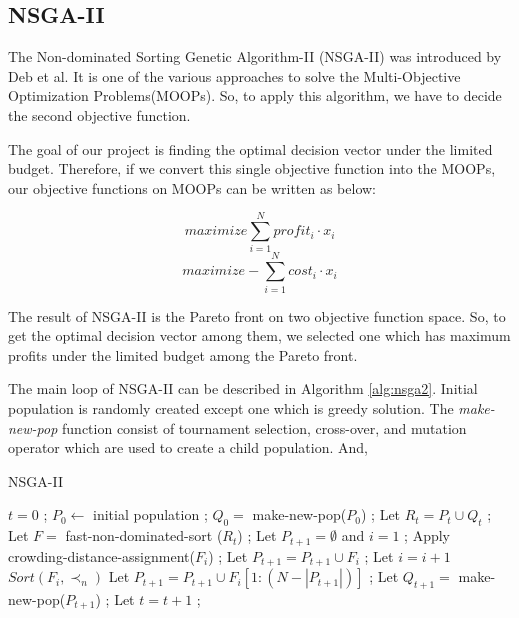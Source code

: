 \subsection{NSGA-II}
The Non-dominated Sorting Genetic Algorithm-II (NSGA-II) was introduced by Deb et al.\cite{NSGA2} It is one of the various approaches to solve the Multi-Objective Optimization Problems(MOOPs). So, to apply this algorithm, we have to decide the second objective function. 

The goal of our project is finding the optimal decision vector under the limited budget. Therefore, if we convert this single objective function into the MOOPs, our objective functions on MOOPs can be written as below:

\[
maximize \sum_{i = 1}^{N} profit_i \cdot x_i
\]
\[
maximize -\sum_{i = 1}^{N} cost_i \cdot x_i
\]

The result of NSGA-II is the Pareto front on two objective function space. So, to get the optimal decision vector among them, we selected one which has maximum profits under the limited budget among the Pareto front.

The main loop of NSGA-II can be described in Algorithm \ref{alg:nsga2}. Initial population is randomly created except one which is greedy solution. The \textit{make-new-pop} function consist of tournament selection, cross-over, and mutation operator which are used to create a child population. And, 

\begin{algorithm}
\caption{NSGA-II}\label{alg:nsga2}
\begin{algorithmic}
    \State $t = 0$ ;
    \State $P_0 \gets$ initial population ;
    \State $Q_0 =$ make-new-pop($P_0$) ;
        \State Let $R_t = P_t \cup Q_t$ ;
        \State Let $F = $ fast-non-dominated-sort ($R_t$) ; %
        \State Let $P_{t+1} = \emptyset$ and $i = 1$ ;
            \State Apply crowding-distance-assignment($F_i$) ; %
            \State Let $P_{t+1} = P_{t+1} \cup F_i$ ;
            \State Let $i = i + 1$
        \EndWhile
        \State $Sort(F_i, \prec_n)$
        \State Let $P_{t+1} = P_{t+1} \cup F_i[1:(N - |P_{t+1}|)]$ ;
        \State Let $Q_{t+1} = $ make-new-pop($P_{t+1}$) ;
        \State Let $t = t + 1$ ;
    \EndWhile
\end{algorithmic}
\end{algorithm}

